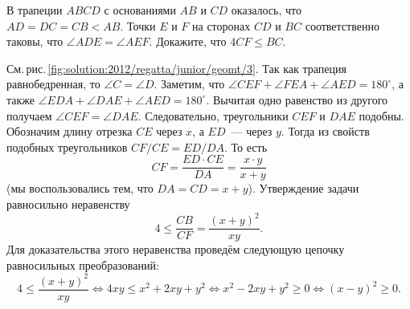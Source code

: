 В трапеции $ABCD$ с основаниями $AB$ и $CD$ оказалось, что $AD = DC = CB < AB$.
Точки $E$ и $F$ на сторонах $CD$ и $BC$ соответственно таковы, что
$\angle ADE = \angle AEF$.
Докажите, что $4 CF \leq BC$.

%
\label{solution:2012/regatta/junior/geomt/3}%
См.\,рис.\,\ref{fig:solution:2012/regatta/junior/geomt/3}.
Так как трапеция равнобедренная, то $\angle C = \angle D$.
Заметим, что
$\angle CEF + \angle FEA + \angle AED = 180^\circ$, а также
$\angle EDA + \angle DAE + \angle AED = 180^\circ$.
Вычитая одно равенство из другого получаем $\angle CEF = \angle DAE$.
Следовательно, треугольники $CEF$ и $DAE$ подобны.
Обозначим длину отрезка $CE$ через $x$, а $ED$~--- через $y$.
Тогда из свойств подобных треугольников $CF / CE = ED / DA$.
То есть
\[
    CF = \frac{ED \cdot CE}{DA} = \frac{x \cdot y}{x + y}
\]
(мы воспользовались тем, что $DA = CD = x + y$).
Утверждение задачи равносильно неравенству
\[
    4 \leq \frac{CB}{CF} = \frac{(x + y)^2}{xy}
.\]
Для доказательства этого неравенства проведём следующую цепочку равносильных
преобразований:
\[
    4 \leq \frac{(x + y)^2}{xy}
\Leftrightarrow
    4 x y \leq x^2 + 2 x y + y^2
\Leftrightarrow
    x^2 - 2 x y + y^2 \geq 0
\Leftrightarrow
    (x - y)^2 \geq 0
.\]

